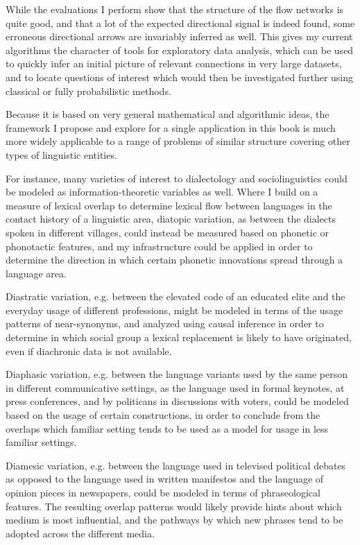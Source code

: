 While the evaluations I perform show that the structure of the flow networks is quite good, and that a lot of the expected directional signal is indeed found, some erroneous directional arrows are invariably inferred as well. This gives my current algorithms the character of tools for exploratory data analysis, which can be used to quickly infer an initial picture of relevant connections in very large datasets, and to locate questions of interest which would then be investigated further using classical or fully probabilistic methods. 

Because it is based on very general mathematical and algorithmic ideas, the framework I propose and explore for a single application in this book is much more widely applicable to a range of problems of similar structure covering other types of linguistic entities. 

For instance, many varieties of interest to dialectology and sociolinguistics could be modeled as information-theoretic variables as well. Where I build on a measure of lexical overlap to determine lexical flow between languages in the contact history of a linguistic area, diatopic variation, as between the dialects spoken in different villages, could instead be measured based on phonetic or phonotactic features, and my infrastructure could be applied in order to determine the direction in which certain phonetic innovations spread through a language area.

Diastratic variation, e.g. between the elevated code of an educated elite and the everyday usage of different professions, might be modeled in terms of the usage patterns of near-synonyms, and analyzed using causal inference in order to determine in which social group a lexical replacement is likely to have originated, even if diachronic data is not available.

Diaphasic variation, e.g. between the language variants used by the same person in different communicative settings, as the language used in formal keynotes, at press conferences, and by politicans in discussions with voters, could be modeled based on the usage of certain constructions, in order to conclude from the overlaps which familiar setting tends to be used as a model for usage in less familiar settings.

Diamesic variation, e.g. between the language used in televised political debates as opposed to the language used in written manifestos and the language of opinion pieces in newspapers, could be modeled in terms of phraseological features. The resulting overlap patterns would likely provide hints about which medium is most influential, and the pathways by which new phrases tend to be adopted across the different media.


